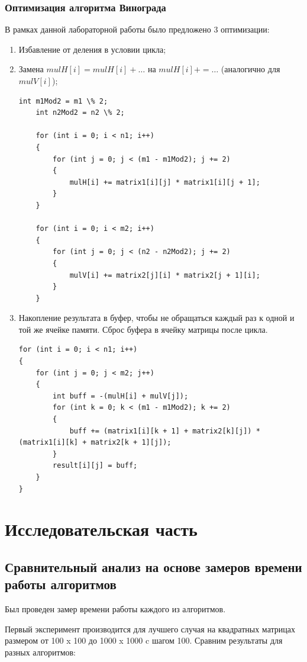 \documentclass[12pt]{report}
\begin{document}
\subsection{Оптимизация алгоритма Винограда}
В рамках данной лабораторной работы было предложено 3 оптимизации:
\begin{enumerate}
	\item Избавление от деления в условии цикла;
	\item Замена $mulH[i] = mulH[i] + …$ на $mulH[i] += …$ (аналогично для $mulV[i]$);
	
\newpage
	\begin{lstlisting}[label=some-code,caption=Оптимизации алгоритма Винограда №1 и №2]
	int m1Mod2 = m1 \% 2;
	int n2Mod2 = n2 \% 2;

	for (int i = 0; i < n1; i++)
	{
		for (int j = 0; j < (m1 - m1Mod2); j += 2)
		{
			mulH[i] += matrix1[i][j] * matrix1[i][j + 1];
		}
	}

	for (int i = 0; i < m2; i++)
	{
		for (int j = 0; j < (n2 - n2Mod2); j += 2)
		{
			mulV[i] += matrix2[j][i] * matrix2[j + 1][i];
		}
	}
	\end{lstlisting}

	\item Накопление результата в буфер, чтобы не обращаться каждый раз к одной и той же ячейке памяти. Сброс буфера в ячейку матрицы после цикла.
	\begin{lstlisting}[label=some-code,caption=Оптимизации алгоритма Винограда №3]
for (int i = 0; i < n1; i++)
{
	for (int j = 0; j < m2; j++)
	{
		int buff = -(mulH[i] + mulV[j]);
		for (int k = 0; k < (m1 - m1Mod2); k += 2)
		{
			buff += (matrix1[i][k + 1] + matrix2[k][j]) * (matrix1[i][k] + matrix2[k + 1][j]);
		}
		result[i][j] = buff;
	}
}
\end{lstlisting}
\end{enumerate}



\chapter{Исследовательская часть}

\section{Сравнительный анализ на основе замеров времени работы алгоритмов}

Был проведен замер времени работы каждого из алгоритмов.

Первый эксперимент производится для лучшего случая на квадратных матрицах размером от 100 x 100 до 1000 x 1000 c шагом 100. 
Сравним результаты для разных алгоритмов:
\end{document}
